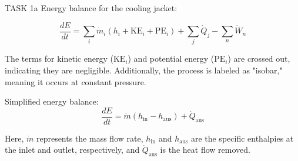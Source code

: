 TASK 1a  
Energy balance for the cooling jacket:  

\[
\frac{dE}{dt} = \sum_i \dot{m}_i \left( h_i + \text{KE}_i + \text{PE}_i \right) + \sum_j \dot{Q}_j - \sum_n \dot{W}_n
\]

The terms for kinetic energy (\( \text{KE}_i \)) and potential energy (\( \text{PE}_i \)) are crossed out, indicating they are negligible. Additionally, the process is labeled as "isobar," meaning it occurs at constant pressure.  

Simplified energy balance:  
\[
\frac{dE}{dt} = \dot{m} \left( h_{\text{in}} - h_{\text{aus}} \right) + \dot{Q}_{\text{aus}}
\]  

Here, \( \dot{m} \) represents the mass flow rate, \( h_{\text{in}} \) and \( h_{\text{aus}} \) are the specific enthalpies at the inlet and outlet, respectively, and \( \dot{Q}_{\text{aus}} \) is the heat flow removed.